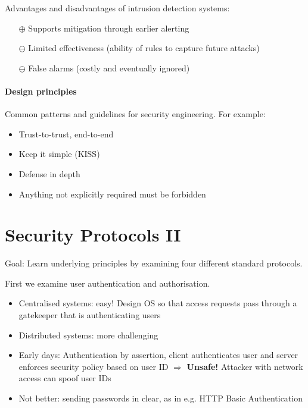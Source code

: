 Advantages and disadvantages of intrusion detection systems:

\begin{itemize}
    \item[$\oplus$] Supports mitigation through earlier alerting

    \item[$\ominus$] Limited effectiveness (ability of rules to capture future attacks)
    \item[$\ominus$] False alarms (costly and eventually ignored)
\end{itemize}

\paragraph{Design principles} Common patterns and guidelines for security engineering. For example:

\begin{itemize}
    \item Trust-to-trust, end-to-end
    \item Keep it simple (KISS)
    \item Defense in depth
    \item Anything not explicitly required must be forbidden
\end{itemize}



\newpage
\section{Security Protocols II}

Goal: Learn underlying principles by examining four different standard protocols.

First we examine user authentication and authorisation.
\begin{itemize}
    \item Centralised systems: easy! Design OS so that access requests pass through a gatekeeper that is authenticating users
    \item Distributed systems: more challenging
    \item Early days: Authentication by assertion, client authenticates user and server enforces security policy based on user ID $\Rightarrow$ \textbf{Unsafe!} Attacker with network access can spoof user IDs
    \item Not better: sending passwords in clear, as in e.g. HTTP Basic Authentication 
\end{itemize}

